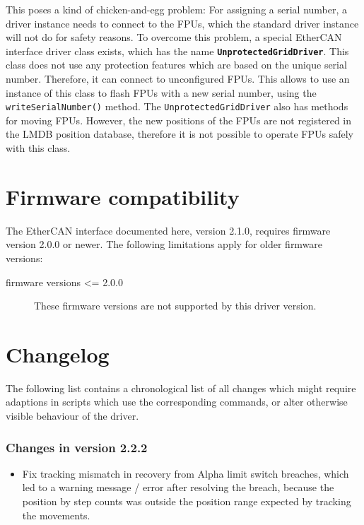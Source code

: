 \documentclass[fontsize=12,a4paper]{scrreprt}
\begin{document}
This poses a kind of chicken-and-egg problem: For assigning a serial
number, a driver instance needs to connect to the FPUs, which the
standard driver instance will not do for safety reasons. To overcome
this problem, a special EtherCAN interface driver class exists, which
has the name \textbf{\texttt{UnprotectedGridDriver}}. This class does
not use any protection features which are based on the unique serial
number. Therefore, it can connect to unconfigured FPUs. This allows to
use an instance of this class to flash FPUs with a new serial number,
using the \texttt{writeSerialNumber()} method. The
\texttt{UnprotectedGridDriver} also has methods for moving
FPUs. However, the new positions of the FPUs are not registered in the
LMDB position database, therefore it is not possible to operate FPUs
safely with this class.


\chapter{Firmware compatibility}
\label{sec:firmware_compatibility}

The EtherCAN interface documented here, version 2.1.0, requires
firmware version 2.0.0 or newer. The following limitations apply for
older firmware versions:

\begin{description}

\item[firmware versions <= 2.0.0] These firmware versions are not
  supported by this driver version.


\end{description}


\chapter{Changelog}
\label{sec:changelog}


The following list contains a chronological list of all changes which
might require adaptions in scripts which use the corresponding
commands, or alter otherwise visible behaviour of the driver.

\subsection*{Changes in version 2.2.2}
\begin{itemize}
\item Fix tracking mismatch in recovery from
  Alpha limit switch breaches, which led to a
  warning message / error after resolving the breach,
  because the position by step counts was outside
  the position range expected by tracking the
  movements.
\end{itemize}
\end{document}
